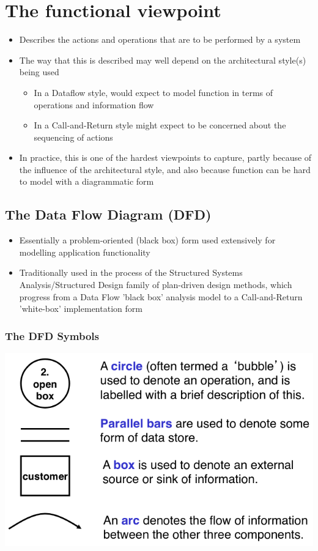 \documentclass{article}[18pt]
\begin{document}
\section{The functional viewpoint}
\begin{itemize}
	\item Describes the actions and operations that are to be performed by a system
	\item The way that this is described may well depend on the architectural style(s) being used
	\begin{itemize}
		\item In a Dataflow style, would expect to model function in terms of operations and information flow
		\item In a Call-and-Return style might expect to be concerned about the sequencing of actions
	\end{itemize}
	\item In practice, this is one of the hardest viewpoints to capture, partly because of the influence of the architectural style, and also because function can be hard to model with a diagrammatic form
\end{itemize}
\subsection{The Data Flow Diagram (DFD)}
\begin{itemize}
	\item Essentially a problem-oriented (black box) form used extensively for modelling application functionality
	\item Traditionally used in the process of the Structured Systems Analysis/Structured Design family of plan-driven design methods, which progress from a Data Flow 'black box' analysis model to a Call-and-Return 'white-box' implementation form
\end{itemize}
\subsubsection{The DFD Symbols}
\begin{center}
	\includegraphics[scale=0.7]{DFD-Symbols}
\end{center}
\end{document}
